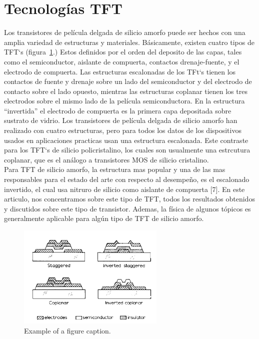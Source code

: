 \documentclass[conference]{IEEEtran}
\begin{document}
\section{Tecnologías TFT}
    Los transistores de película delgada de silicio amorfo puede ser hechos con una amplia
    variedad de estructuras y materiales. Básicamente, existen cuatro tipos
    de TFT`s (figura~\ref{fig1}.) Estos definidos por el orden del deposito de las capas, tales como el semiconductor,
    aislante de compuerta, contactos drenaje-fuente, y el electrodo de
    compuerta. Las estructuras escalonadas de los TFt`s tienen los contactos de fuente y drenaje
    sobre un lado del semiconductor y del electrodo de contacto sobre el lado opuesto,
    mientras las estructuras coplanar tienen los tres electrodos sobre
    el mismo lado de la película semiconductora. En la estructura ``invertida'' el
    electrodo de compuerta es la primera capa depositada sobre sustrato de vidrio.
    Los transistores de película delgada de silicio amorfo han realizado con cuatro estructuras,
    pero para todos los datos de los dispositivos usados en aplicaciones
    practicas usan una estructura escalonada. Este contraste para los TFT`s de silicio
    policristalino, los cuales son usualmente una estrcutura coplanar, que es el análogo 
    a transistores MOS de silicio cristalino.
    \\
    Para TFT de silicio amorfo, la estructura mas popular y una de las mas responsables
    para el estado del arte con respecto al desempeño, es el escalonado invertido, el
    cual usa nitruro de silicio como aislante de compuerta [7]. En este articulo, nos
    concentramos sobre este tipo de TFT, todos los resultados obtenidos y discutidos
    sobre este tipo de transistor. Ademas, la física de algunos tópicos es generalmente
    aplicable para algún tipo de TFT de silicio amorfo.

\begin{figure}[htbp]
    \centerline{\includegraphics[width=7cm]{img/imagen-1.png}}
    \caption{Example of a figure caption.}%
    \label{fig1}
\end{figure}
 
\end{document}
